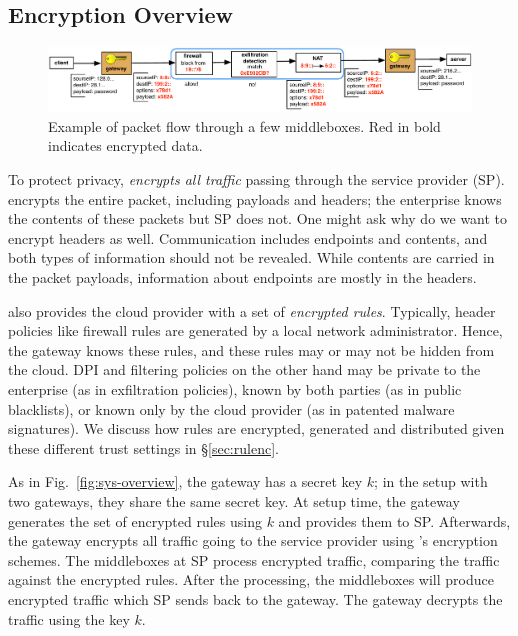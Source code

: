 \subsection{Encryption Overview}

\begin{figure}[t!]
\vspace{-10pt}
\centering
  \includegraphics[width=6.7in]{fig/packetpath.pdf}
\caption{Example of packet flow through a few middleboxes. Red in bold indicates encrypted data. \label{fig:packetflow}}
\end{figure}

To protect privacy, \sys \textit{encrypts all traffic} passing through the service provider (SP).
\sys encrypts the entire packet, including payloads and headers; the enterprise knows the contents of these packets but SP does not. One might ask why do we want to encrypt headers as well. Communication includes endpoints and contents, and both types of information should not be revealed. While contents are carried in the packet payloads, information about endpoints are mostly in the headers. 

\sys also provides the cloud provider with a set of {\it encrypted rules}.
Typically, header policies like firewall rules are generated by a local network administrator. Hence, the gateway knows these rules, and these rules may or may not be hidden from the cloud.
DPI and filtering policies on the other hand may be private to the enterprise (as in exfiltration policies), known by both parties (as in  public blacklists), or known only by the cloud provider (as in  patented malware signatures).
We discuss how rules are encrypted, generated and distributed given these different trust settings in \S\ref{sec:rulenc}.

As in Fig.~\ref{fig:sys-overview}, the gateway has a secret key $k$; in the setup with two gateways, they share
the same secret key. 
At setup time, the gateway generates the set of encrypted rules using $k$ and provides them to SP.
Afterwards, the gateway encrypts all traffic going to the service provider using \sys's encryption schemes.
The middleboxes at SP process  encrypted traffic, comparing the traffic against the encrypted rules. 
After the processing, the middleboxes
will produce encrypted traffic which SP sends back to the gateway. The gateway decrypts the traffic using the key $k$.

